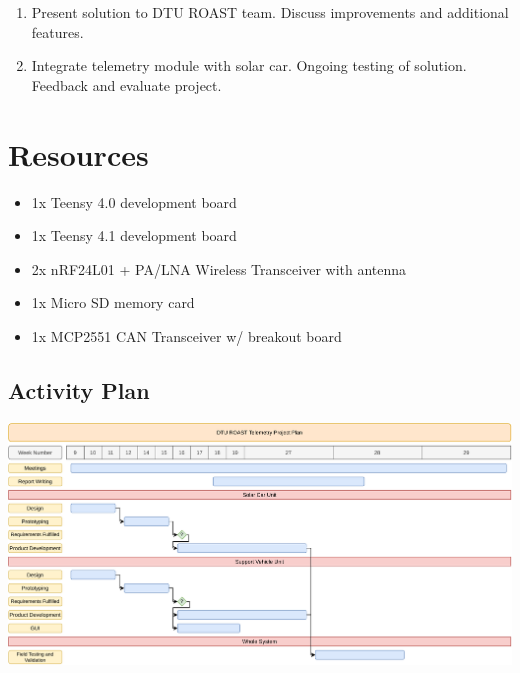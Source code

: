 \documentclass[]{article}
\begin{document}
\begin{enumerate}
    \item Present solution to DTU ROAST team. Discuss improvements and additional features. 
    \item Integrate telemetry module with solar car. Ongoing testing of solution. Feedback and evaluate project. 
\end{enumerate}
\section{Resources}
\begin{itemize}
    \item 1x Teensy 4.0 development board
    \item 1x Teensy 4.1 development board
    \item 2x nRF24L01 + PA/LNA Wireless Transceiver with antenna
    \item 1x Micro SD memory card
    \item 1x MCP2551 CAN Transceiver w/ breakout board
\end{itemize}
\newpage


\begin{landscape}
\section{Activity Plan}
\hspace{1.5cm}\includegraphics[width=1.35\textwidth]{documentation/images/projectPlan.pdf}
\end{landscape}
\end{document}
